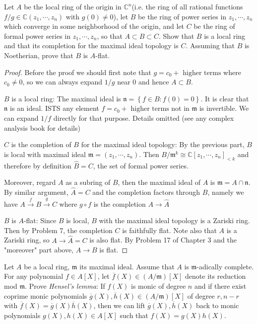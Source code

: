 \documentclass{solution}
\begin{document}
\begin{problem}
    Let $A$ be the local ring of the origin in $\mathbb{C}^n$(i.e. the ring of all rational functions $f / g \in \mathbb{C}(z_1, \cdots, z_n)$ with $g(0) \ne 0$), let $B$ be the ring of power series in $z_1, \cdots, z_n$ which converge in some neighborhood of the origin, and let $C$ be the ring of formal power series in $z_1, \cdots, z_n$, so that $A \subset B \subset C$. Show that $B$ is a local ring and that its completion for the maximal ideal topology is $C$. Assuming that $B$ is Noetherian, prove that $B$ is $A$-flat.
\end{problem}

\begin{proof}
    Before the proof we should first note that $g = c_0 + \text{ higher terms}$ where $c_0 \ne 0$, so we can always expand $1 / g$ near $0$ and hence $A \subset B$.

    $B$ is a local ring: The maximal ideal is $\mathfrak{n} = \left\lbrace f \in B: f(0) = 0 \right\rbrace$. It is clear that $\mathfrak{n}$ is an ideal. ISTS any element $f = c_0 + \text{ higher terms}$ not in $\mathfrak{m}$ is invertible. We can expand $1 / f$ directly for that purpose. Details omitted (see any complex analysis book for details)

    $C$ is the completion of $B$ for the maximal ideal topology: By the previous part, $B$ is local with maximal ideal $\mathfrak{m} = (z_1, \cdots, z_n)$. Then $B / \mathfrak{m}^k \cong \mathbb{C}[z_1, \cdots, z_n]_{\lt k}$ and therefore by definition $\hat{B} = C$, the set of formal power series.
    
    Moreover, regard $A$ as a subring of $B$, then the maximal ideal of $A$ is $\mathfrak{m} = A \cap \mathfrak{n}$. By similar argument, $\hat{A} = C$ and the completion factors through $B$, namely we have $A \xrightarrow{f} B \xrightarrow{g} C$ where $g \circ f$ is the completion $A \rightarrow \hat{A}$

    $B$ is $A$-flat: Since $B$ is local, $B$ with the maximal ideal topology is a Zariski ring. Then by Problem 7, the completion $C$ is faithfully flat. Note also that $A$ is a Zariski ring, so $A \rightarrow \hat{A} = C$ is also flat. By Problem 17 of Chapter 3 and the "moreover" part above, $A \rightarrow B$ is flat.
\end{proof}

\begin{problem}
    Let $A$ be a local ring, $\mathfrak{m}$ its maximal ideal. Assume that $A$ is $\mathfrak{m}$-adically complete. For any polynomial $f \in A[X]$, let $\overline{f}(X) \in (A / \mathfrak{m})[X]$ denote its reduction mod $\mathfrak{m}$. Prove \textit{Hensel's lemma}: If $f(X)$ is monic of degree $n$ and if there exist coprime monic polynomials $\overline{g}(X), \overline{h}(X) \in (A / \mathfrak{m})[X]$ of degree $r, n - r$ with $\overline{f}(X) = \overline{g}(X) \overline{h}(X)$, then we can lift $\overline{g}(X), \overline{h}(X)$ back to monic polynomials $g(X), h(X) \in A[X]$ such that $f(X) = g(X) h(X)$.
\end{problem}
\end{document}
